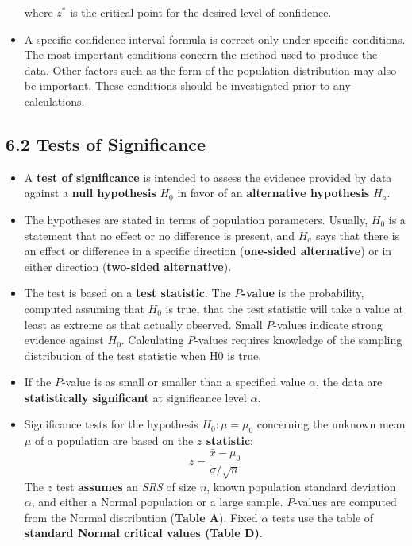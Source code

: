 \begin{itemize}
			where $z^{*}$ is the critical point for the desired level of confidence.
			
			\item A specific confidence interval formula is correct only under specific conditions. The most important conditions concern the method used to produce the data. Other factors such as the form of the population distribution may also be important. These conditions should be investigated prior to any calculations.
		\end{itemize}
	\subsection{6.2 Tests of Significance}
		\begin{itemize}
			\item A \textbf{test of significance} is intended to assess the evidence provided by data against a \textbf{null hypothesis} $H_0$ in favor of an \textbf{alternative hypothesis} $H_a$.
			
			\item The hypotheses are stated in terms of population parameters. Usually, $H_0$ is a statement that no effect or no difference is present, and $H_a$ says that there is an effect or difference in a specific direction (\textbf{one-sided alternative}) or in either direction (\textbf{two-sided alternative}).
			
			\item The test is based on a \textbf{test statistic}. The \textbf{$P$-value} is the probability, computed assuming that $H_0$ is true, that the test statistic will take a value at least as extreme as that actually observed. Small $P$-values indicate strong evidence against $H_0$. Calculating $P$-values requires knowledge of the sampling distribution of the test statistic when H0 is true.
			
			\item If the $P$-value is as small or smaller than a specified value $\alpha$, the data are \textbf{statistically significant} at significance level $\alpha$.
			
			\item Significance tests for the hypothesis $H_0: \mu = \mu_0$ concerning the unknown mean $\mu$ of a population are based on the \textbf{$z$ statistic}: \[z=\frac{\bar{x}-\mu_0}{\sigma/\sqrt{n}}\]			
			The $z$ test \textbf{assumes} an \textit{SRS} of size $n$, known population standard deviation $\alpha$, and either a Normal population or a large sample. $P$-values are computed from the Normal distribution (\textbf{Table A}). Fixed $\alpha$ tests use the table of \textbf{standard Normal critical values (Table D)}.
		\end{itemize}
